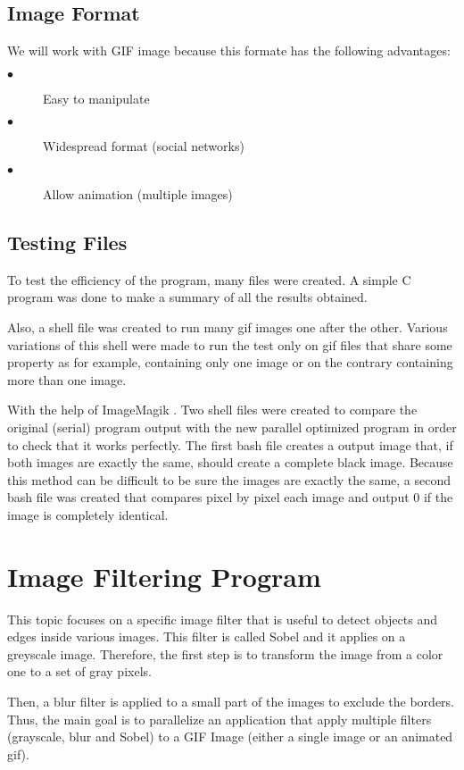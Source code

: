 \documentclass[conference,compsoc]{IEEEtran}
\begin{document}
\subsection{Image Format}
We will work with GIF image because this formate has the following advantages:
\begin{description}
	\item[$\bullet$] Easy to manipulate
	\item[$\bullet$] Widespread format (social networks)
	\item[$\bullet$] Allow animation (multiple images)
\end{description}

\subsection{Testing Files}
To test the efficiency of the program, many files were created. A simple C program was done to make a summary of all the results obtained.

Also, a shell file was created to run many gif images one after the other. Various variations of this shell were made to run the test only on gif files that share some property as for example, containing only one image or on the contrary containing more than one image.

With the help of ImageMagik \cite{IMAGEMAGICK}. Two shell files were created to compare the original (serial) program output with the new parallel optimized program in order to check that it works perfectly. The first bash file creates a output image that, if both images are exactly the same, should create a complete black image. Because this method can be difficult to be sure the images are exactly the same, a second bash file was created that compares pixel by pixel each image and output 0 if the image is completely identical.

\section{Image Filtering Program}
This topic focuses on a specific image filter that is useful to detect objects and edges inside various images. This filter is called Sobel and it applies on a greyscale image. Therefore, the first step is to transform the image from a color one to a set of gray pixels. 

Then, a blur filter is applied to a small part of the images to exclude the borders. Thus, the main goal is to parallelize an application that apply multiple filters (grayscale, blur and Sobel) to a GIF Image (either a single image or an animated gif). \cite{CoursePage}
\end{document}
